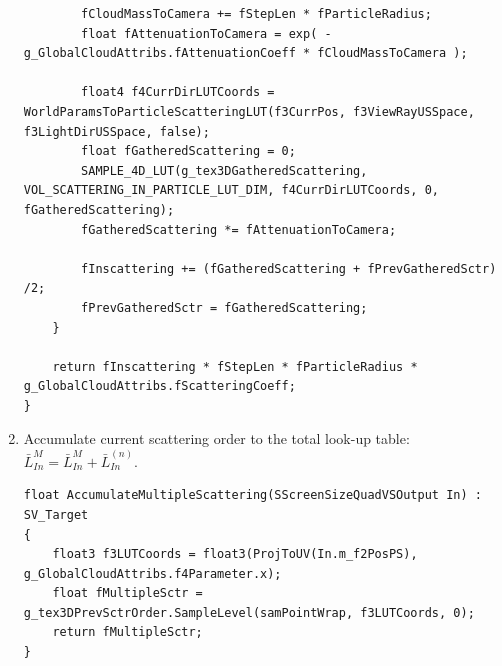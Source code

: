 \begin{enumerate}
\begin{lstlisting}
        fCloudMassToCamera += fStepLen * fParticleRadius;
        float fAttenuationToCamera = exp( -g_GlobalCloudAttribs.fAttenuationCoeff * fCloudMassToCamera );

        float4 f4CurrDirLUTCoords = WorldParamsToParticleScatteringLUT(f3CurrPos, f3ViewRayUSSpace, f3LightDirUSSpace, false);
        float fGatheredScattering = 0;
        SAMPLE_4D_LUT(g_tex3DGatheredScattering, VOL_SCATTERING_IN_PARTICLE_LUT_DIM, f4CurrDirLUTCoords, 0, fGatheredScattering);
        fGatheredScattering *= fAttenuationToCamera;

        fInscattering += (fGatheredScattering + fPrevGatheredSctr) /2;
        fPrevGatheredSctr = fGatheredScattering;
    }

    return fInscattering * fStepLen * fParticleRadius * g_GlobalCloudAttribs.fScatteringCoeff;
}
\end{lstlisting}

\item Accumulate current scattering order to the total look-up table: $\bar{L}_{In}^M = \bar{L}_{In}^M + \bar{L}_{In}^{(n)}$.
\begin{lstlisting}
float AccumulateMultipleScattering(SScreenSizeQuadVSOutput In) : SV_Target
{
    float3 f3LUTCoords = float3(ProjToUV(In.m_f2PosPS), g_GlobalCloudAttribs.f4Parameter.x);
    float fMultipleSctr = g_tex3DPrevSctrOrder.SampleLevel(samPointWrap, f3LUTCoords, 0);
    return fMultipleSctr;
}
\end{lstlisting}
\end{enumerate}